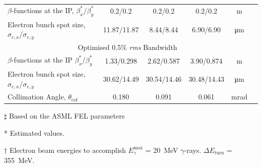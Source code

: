 \documentclass[../main.tex]{subfiles}
\begin{document}
\begin{table}[!h]
\begin{threeparttable}
{\begin{tabular}{lccccc}
\hline
$\beta$-functions at the IP, $\beta_{x}^{*}$/$\beta_{y}^{*}$ & 0.2/0.2 & 0.2/0.2 & 0.2/0.2 & \si{\meter} \\
Electron bunch spot size, $\sigma_{e,x}$/$\sigma_{e,y}$ & 11.87/11.87 & 8.44/8.44 & 6.90/6.90 & \si{\micro\meter}\\
\hline\multicolumn{5}{c}{Optimised 0.5\% \textit{rms} Bandwidth} \\
\hline
$\beta$-functions at the IP $\beta_{x}^{*}$/$\beta_{y}^{*}$ & 1.33/0.298 & 2.62/0.587 & 3.90/0.874 & \si{\meter} \\
Electron bunch spot size, $\sigma_{e,x}$/$\sigma_{e,y}$ & 30.62/14.49 & 30.54/14.46 & 30.48/14.43 & \si{\micro\meter}\\
Collimation Angle, $\theta_{\mathrm{col}}$ & 0.180 & 0.091 & 0.061 & \si{\milli\radian} \\ 
\hline\hline
\end{tabular}}
\begin{tablenotes}
\item[$\sharp$]{Based on the ASML FEL parameters \cite{akkermans2017compact}}
\item[*]{Estimated values.}
\item[$\dagger$]{Electron beam energies to accomplish $E_{\gamma}^{\mathrm{max}}$ = 20~\si{\mega\electronvolt} $\gamma$-rays. $\Delta E_{\mathrm{turn}}$ = 355~\si{\mega\electronvolt}.}
\end{tablenotes}
\end{threeparttable}
\label{tab:DIANA_electron_beam_design_parameters}
\end{table}
\end{document}
